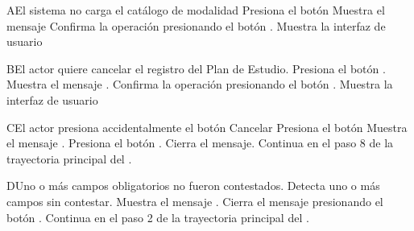 
\begin{UCtrayectoriaA}{A}{El sistema no carga el catálogo de modalidad}
	\UCpaso[\UCactor] Presiona el botón 
	\UCpaso Muestra el mensaje 
	\UCpaso[\UCactor] Confirma la operación presionando el botón .
	 \UCpaso Muestra la interfaz de usuario 
    
\end{UCtrayectoriaA}



\begin{UCtrayectoriaA}{B}{El actor quiere cancelar el registro del Plan de Estudio.}
	\UCpaso[\UCactor] Presiona el botón .
	\UCpaso Muestra el mensaje .
	\UCpaso[\UCactor] Confirma la operación presionando el botón .
	\UCpaso Muestra la interfaz de usuario 
\end{UCtrayectoriaA}




\begin{UCtrayectoriaA}{C}{El actor presiona accidentalmente el botón Cancelar}
	\UCpaso[\UCactor] Presiona el botón 
	\UCpaso Muestra el mensaje .
	\UCpaso[\UCactor] Presiona el botón .
	\UCpaso Cierra el mensaje.
	\UCpaso Continua en el paso 8 de la trayectoria principal del .
\end{UCtrayectoriaA}




\begin{UCtrayectoriaA}{D}{Uno o más campos obligatorios no fueron contestados.}
	\UCpaso Detecta uno o más campos sin contestar.
	\UCpaso Muestra el mensaje .
	\UCpaso[\UCactor] Cierra el mensaje presionando el botón .
	\UCpaso Continua en el paso 2 de la trayectoria principal del .
\end{UCtrayectoriaA}
